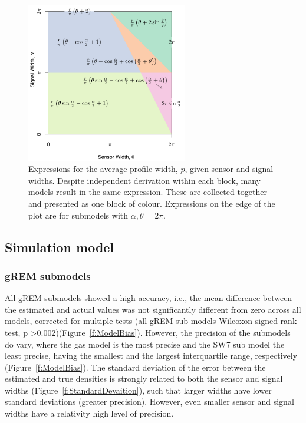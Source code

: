 \documentclass[a4paper,10pt,reqno,oneside]{amsart}
\begin{document}
\begin{figure}
	\centering
	\includegraphics[width=7cm]{imgs/equalModelResults.pdf}
	\caption{Expressions for the average profile width, $\bar{p}$, given sensor and signal widths. Despite independent derivation within each block, many models result in the same expression. These are collected together and presented as one block of colour. Expressions on the edge of the plot are for submodels with $\alpha, \theta = 2\pi$. }
	\label{f:equalModelResults}
\end{figure}



\subsection{Simulation model}

\subsubsection{gREM submodels}
All gREM submodels showed a high accuracy, i.e., the mean difference between the estimated and actual values was not significantly different from zero across all models, corrected for multiple tests (all gREM sub models Wilcoxon signed-rank test, p \textgreater 0.002)(Figure~\ref{f:ModelBias}). However, the precision of the submodels do vary, where the gas model is the most precise and the SW7 sub model the least precise, having the smallest and the largest interquartile range, respectively (Figure~\ref{f:ModelBias}). The standard deviation of the error between the estimated and true densities is strongly related to both the sensor and signal widths (Figure~\ref{f:StandardDevaition}), such that larger widths have lower standard deviations (greater precision). However, even smaller sensor and signal widths have a relativity high level of precision. 
\end{document}
